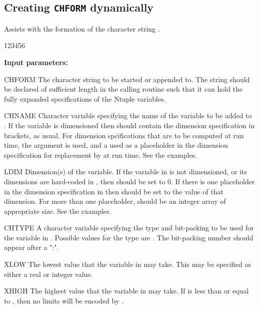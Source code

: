 \subsection{Creating \texttt{CHFORM} dynamically}


\Action Assists with the formation of the character string .

\begin{DLttc}{123456}
\item[{\rm\bf Input parameters:}]
\item[CHFORM] The character string to be started or appended to. The
  string should be declared of sufficient length in the calling
  routine such that it can hold the fully expanded specifications of
  the Ntuple variables.
\item[CHNAME] Character variable specifying the name of the variable
  to be added to .  If the variable is dimensioned then
   should contain the dimension specification in brackets,
  as usual. For dimension spcifications that are to be computed at run
  time, the  argument is used, and a \Lit{*} used as a
  placeholder in the dimension specification for replacement by
   at run time. See the examples.
\item[LDIM] Dimension(s) of the variable.  If the variable in
   is not dimensioned, or its dimensions are hard-coded in
  , then  should be set to 0.  If there is one
  \Lit{*} placeholder in the dimension specification in 
  then  should be set to the value of that dimension. For
  more than one placeholder,  should be an integer array of
  appropriate size. See the examples.
\item[CHTYPE] A character variable specifying the type and bit-packing
  to be used for the variable in . Possible values for the
  type are \Lit{[R,I,U,L,C][*[4..32]]}. The bit-packing number should
  appear after a ":".
\item[XLOW] The lowest value that the variable in  may
  take. This may be specified as either a real or integer value.
\item[XHIGH] The highest value that the variable in  may
  take.  If  is less than or equal to , then no
  limits will be encoded by .
\end{DLttc}

